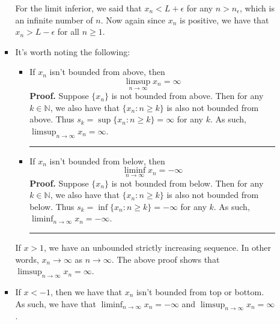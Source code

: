 \documentclass{article}%
\newenvironment{proof}[1][Proof]{\textbf{#1.} }{\ \rule{0.5em}{0.5em}}
\begin{document}
\begin{enumerate}
\begin{enumerate}
\begin{itemize}
            For the limit inferior, we said that $x_n < L + \epsilon$ for any $n > n_\epsilon$, which is an infinite number of $n$. Now again since $x_n$ is positive, we have that $x_n > L - \epsilon$ for all $n \geq 1$.
            \item It's worth noting the following:
            \begin{itemize}
                \item If $x_n$ isn't bounded from above, then \[\limsup_{n\to\infty}x_n = \infty\]
                \begin{proof}
                    Suppose $\{x_n\}$ is not bounded from above. Then for any $k \in \mathbb{N}$, we also have that $\{x_n : n \geq k\}$ is also not bounded from above. Thus $s_k = \sup\{x_n : n \geq k\} = \infty$ for any $k$. As such, $\limsup_{n\to\infty}x_n = \infty$.
                \end{proof}
                \item If $x_n$ isn't bounded from below, then \[\liminf_{n\to\infty}x_n = -\infty\]
                \begin{proof}
                    Suppose $\{x_n\}$ is not bounded from below. Then for any $k \in \mathbb{N}$, we also have that $\{x_n : n \geq k\}$ is also not bounded from below. Thus $s_k = \inf\{x_n : n \geq k\} = -\infty$ for any $k$. As such, $\liminf_{n\to\infty}x_n = -\infty$.
                \end{proof}
            \end{itemize}
            If $x > 1$, we have an unbounded strictly increasing sequence. In other words, $x_n \to \infty $ as $n \to \infty$. The above proof shows that $\limsup_{n\to\infty}x_n = \infty$.
            \item If $x < -1$, then we have that $x_n$ isn't bounded from top or bottom. As such, we have that $\liminf_{n\to\infty}x_n = -\infty$ and $\limsup_{n\to\infty}x_n = \infty$.
        \end{itemize}
    \end{enumerate}
\end{enumerate}
\end{document}
